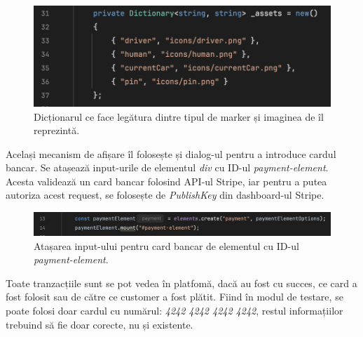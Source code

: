 \begin{figure}[H]
    \centering
    \includegraphics[width=14cm]{Assets/icons.png}
    \caption{Dicționarul ce face legătura dintre tipul de marker și imaginea de îl reprezintă.}
    \label{fig:icons}
\end{figure}

Același mecanism de afișare îl folosește și dialog-ul pentru a introduce cardul bancar. 
Se atașează input-urile de elementul \textit{div} cu ID-ul \textit{payment-element}. Acesta
validează un card bancar folosind API-ul Stripe, iar pentru a putea autoriza acest request,
se folosește de \textit{PublishKey} din dashboard-ul Stripe.

\begin{figure}[H]
    \centering
    \includegraphics[width=16cm]{Assets/stripeMount.png}
    \caption{Atașarea input-ului pentru card bancar de elementul cu ID-ul \textit{payment-element}.}
    \label{fig:stripeMount}
\end{figure}

Toate tranzacțiile sunt se pot vedea în platfomă, dacă au fost cu succes, ce card a fost folosit sau de către ce customer a fost plătit.
Fiind în modul de testare, se poate folosi doar cardul cu numărul: \textit{4242 4242 4242 4242}, restul informațiilor
trebuind să fie doar corecte, nu și existente.

